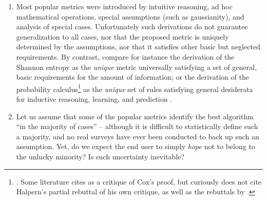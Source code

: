 \documentclass[\ifafour a4paper,12pt,\else a5paper,10pt,\fi%
onecolumn,oneside,article,%
british%
]{memoir}
\theoremstyle{remark}
\theoremstyle{innote}
\renewcommand*{\|}[1][]{\nonscript\:#1\vert\nonscript\:\mathopen{}}
\newcommand*{\sect}{\S}%
\newcommand*{\chap}{ch.}%
\newcommand*{\chaps}{chs}%
\begin{document}
\begin{enumerate}
\item\label{item:ad_hoc} Most popular metrics were introduced by intuitive reasoning, ad hoc mathematical operations, special assumptions (such as gaussianity\autocites[e.g.][\sect~31 p.~183 for the Matthews correlation coefficient]{fisher1925_r1963}), and analysis of special cases. Unfortunately such derivations do not guarantee generalization to all cases, nor that the proposed metric is uniquely determined by the assumptions, nor that it satisfies other basic but neglected requirements. By contrast, compare for instance the derivation of the Shannon entropy \autocites{shannon1948}[\sect~3.2]{woodward1953_r1964}[also][]{goodetal1968} as the \emph{unique} metric universally satisfying a set of general, basic requirements for the amount of information; or the derivation of the probability calculus\footnote{\cites{cox1946,fine1973}[\chaps~1--2]{jaynes1994_r2003}. Some literature cites \cite{halpern1999} as a critique of Cox's proof, but curiously does not cite Halpern's \cite*{halpern1999b} partial rebuttal of his own critique, as well as the rebuttals by \cite{snow1998,snow2001}.} as the \emph{unique} set of rules satisfying general desiderata for inductive reasoning, learning, and prediction \autocites{selfetal1987,cheeseman1988}[\chap~12]{russelletal1995_r2022}.
  
\item\label{item:hope_medical} Let us assume that some of the popular metrics identify the best algorithm \enquote{in the majority of cases} -- although it is difficult to statistically define such a majority, and no real surveys have ever been conducted to back up such an assumption. Yet, do we expect the end user to simply \emph{hope} not to belong to the unlucky minority? Is such uncertainty inevitable?


\end{enumerate}
\end{document}

